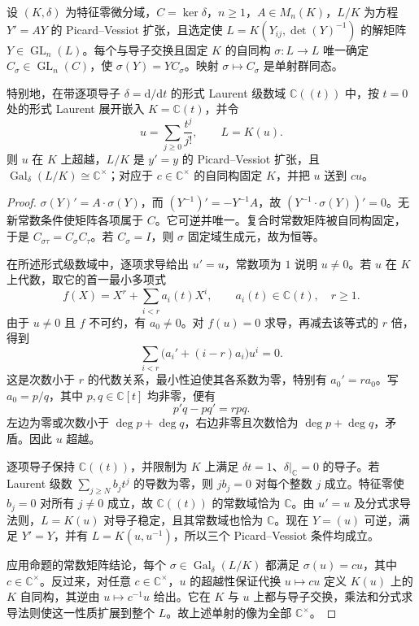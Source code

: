 \begin{proposition}\label{b3:prop:pv-constant-matrices}\label{b3:prop:E-formal-exponential-pv}
	设 \((K,\delta)\) 为特征零微分域，\(C=\ker\delta\)，\(n\ge1\)，\(A\in M_n(K)\)，\(L/K\) 为方程 \(Y'=AY\) 的 Picard--Vessiot 扩张，且选定使 \(L=K(Y_{ij},\det(Y)^{-1})\) 的解矩阵 \(Y\in\operatorname{GL}_n(L)\)。每个与导子交换且固定 \(K\) 的自同构 \(\sigma:L\to L\) 唯一确定 \(C_\sigma\in\operatorname{GL}_n(C)\)，使 \(\sigma(Y)=YC_\sigma\)。映射 \(\sigma\mapsto C_\sigma\) 是单射群同态。

	特别地，在带逐项导子 \(\delta=\mathrm{d}/\mathrm{d}t\) 的形式 Laurent 级数域 \(\mathbb C(\!(t)\!)\) 中，按 \(t=0\) 处的形式 Laurent 展开嵌入 \(K=\mathbb C(t)\)，并令
	\[
		u=\sum_{j\ge0}\frac{t^j}{j!},\qquad L=K(u).
	\]
	则 \(u\) 在 \(K\) 上超越，\(L/K\) 是 \(y'=y\) 的 Picard--Vessiot 扩张，且 \(\operatorname{Gal}_\delta(L/K)\cong\mathbb C^\times\)；对应于 \(c\in\mathbb C^\times\) 的自同构固定 \(K\)，并把 \(u\) 送到 \(cu\)。
\end{proposition}
\begin{proof}
	\(\sigma(Y)'=A\cdot\sigma(Y)\)，而 \((Y^{-1})'=-Y^{-1}A\)，故 \((Y^{-1}\cdot\sigma(Y))'=0\)。无新常数条件使矩阵各项属于 \(C\)。它可逆并唯一。复合时常数矩阵被自同构固定，于是 \(C_{\sigma\tau}=C_\sigma C_\tau\)。若 \(C_\sigma=I\)，则 \(\sigma\) 固定域生成元，故为恒等。

	在所述形式级数域中，逐项求导给出 \(u'=u\)，常数项为 \(1\) 说明 \(u\ne0\)。若 \(u\) 在 \(K\) 上代数，取它的首一最小多项式
	\[
		f(X)=X^r+\sum_{i<r}a_i(t)X^i,\qquad a_i(t)\in\mathbb C(t),\quad r\ge1.
	\]
	由于 \(u\ne0\) 且 \(f\) 不可约，有 \(a_0\ne0\)。对 \(f(u)=0\) 求导，再减去该等式的 \(r\) 倍，得到
	\[
		\sum_{i<r}\bigl(a_i'+(i-r)a_i\bigr)u^i=0.
	\]
	这是次数小于 \(r\) 的代数关系，最小性迫使其各系数为零，特别有 \(a_0'=ra_0\)。写 \(a_0=p/q\)，其中 \(p,q\in\mathbb C[t]\) 均非零，便有
	\[
		p'q-pq'=rpq.
	\]
	左边为零或次数小于 \(\deg p+\deg q\)，右边非零且次数恰为 \(\deg p+\deg q\)，矛盾。因此 \(u\) 超越。

	逐项导子保持 \(\mathbb C(\!(t)\!)\)，并限制为 \(K\) 上满足 \(\delta t=1\)、\(\delta|_{\mathbb C}=0\) 的导子。若 Laurent 级数 \(\sum_{j\ge N}b_jt^j\) 的导数为零，则 \(jb_j=0\) 对每个整数 \(j\) 成立。特征零使 \(b_j=0\) 对所有 \(j\ne0\) 成立，故 \(\mathbb C(\!(t)\!)\) 的常数域恰为 \(\mathbb C\)。由 \(u'=u\) 及分式求导法则，\(L=K(u)\) 对导子稳定，且其常数域也恰为 \(\mathbb C\)。现在 \(Y=(u)\) 可逆，满足 \(Y'=Y\)，并有 \(L=K(u,u^{-1})\)，所以三个 Picard--Vessiot 条件均成立。

	应用命题的常数矩阵结论，每个 \(\sigma\in\operatorname{Gal}_\delta(L/K)\) 都满足 \(\sigma(u)=cu\)，其中 \(c\in\mathbb C^\times\)。反过来，对任意 \(c\in\mathbb C^\times\)，\(u\) 的超越性保证代换 \(u\mapsto cu\) 定义 \(K(u)\) 上的 \(K\) 自同构，其逆由 \(u\mapsto c^{-1}u\) 给出。它在 \(K\) 与 \(u\) 上都与导子交换，乘法和分式求导法则使这一性质扩展到整个 \(L\)。故上述单射的像为全部 \(\mathbb C^\times\)。
\end{proof}

